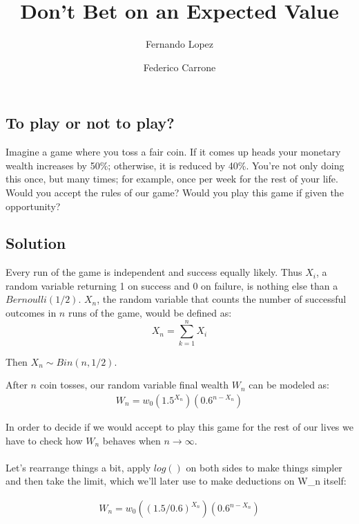 \documentclass[12pt]{article}
\title{Don't Bet on an Expected Value}
\author{Fernando Lopez \and Federico Carrone}
\begin{document}
\maketitle
{}

\subsection{To play or not to play?}

Imagine a game where you toss a fair coin. If it comes up heads your monetary wealth increases by 50\%; otherwise, it is reduced by 40\%. You’re not only doing this once, but many times; for example, once per week for the rest of your life. Would you accept the rules of our game? Would you play this game if given the opportunity?

\subsection{Solution}
Every run of the game is independent and success equally likely. Thus $X_i$, a random variable returning 1 on success and 0 on failure, is nothing else than a $Bernoulli(1/2)$. $X_n$, the random variable that counts the number of successful outcomes in $n$ runs of the game, would be defined as:
\begin{equation*}
 X_n = \sum\limits_{k=1}^{n} X_i
\end{equation*}

Then $X_n \sim Bin(n, 1/2)$.

After $n$ coin tosses, our random variable final wealth $W_n$ can be modeled as:
\begin{align}
  \begin{equation*}
    W_n = w_0 \left(1.5^{X_n}\right)\left(0.6^{n-X_n}\right)
  \end{equation*}
\end{align}

In order to decide if we would accept to play this game for the rest of our lives we have to check how $W_n$ behaves when $n \rightarrow \infty$.
\\\\

Let's rearrange things a bit, apply $log()$ on both sides to make things simpler and then take the limit, which we'll later use to make deductions on W_n itself:

\begin{align}
    \begin{equation*}
        W_n = w_0 \left((1.5/0.6)^{X_n}\right) \left(0.6^{n - X_n}\right)
    \end{equation*}
\end{align}
\end{document}
